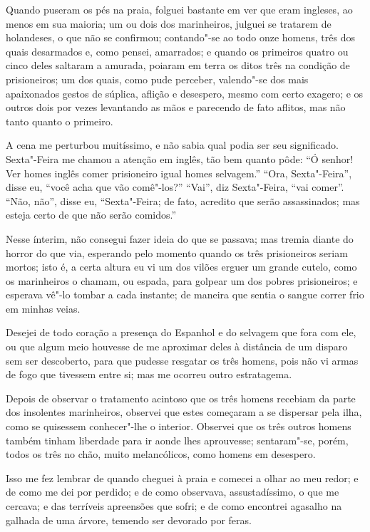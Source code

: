 Quando puseram os pés na praia, folguei bastante em ver que eram
ingleses, ao menos em sua maioria; um ou dois dos marinheiros, julguei
se tratarem de holandeses, o que não se confirmou; contando"-se ao todo
onze homens, três dos quais desarmados e, como pensei, amarrados; e
quando os primeiros quatro ou cinco deles saltaram a amurada, poiaram em
terra os ditos três na condição de prisioneiros; um dos quais, como pude
perceber, valendo"-se dos mais apaixonados gestos de súplica, aflição e
desespero, mesmo com certo exagero; e os outros dois por vezes
levantando as mãos e parecendo de fato aflitos, mas não tanto quanto o
primeiro.

A cena me perturbou muitíssimo, e não sabia qual podia ser seu
significado. Sexta"-Feira me chamou a atenção em inglês, tão bem quanto
pôde: ``Ó senhor! Ver homes inglês comer prisioneiro igual homes
selvagem.'' ``Ora, Sexta"-Feira'', disse eu, ``você acha que vão
comê"-los?'' ``Vai'', diz Sexta"-Feira, ``vai comer''. ``Não, não'', disse
eu, ``Sexta"-Feira; de fato, acredito que serão assassinados; mas esteja
certo de que não serão comidos.''

Nesse ínterim, não consegui fazer ideia do que se passava; mas tremia
diante do horror do que via, esperando pelo momento quando os três
prisioneiros seriam mortos; isto é, a certa altura eu vi um dos vilões
erguer um grande cutelo, como os marinheiros o chamam, ou espada, para
golpear um dos pobres prisioneiros; e esperava vê"-lo tombar a cada
instante; de maneira que sentia o sangue correr frio em minhas veias.

Desejei de todo coração a presença do Espanhol e do selvagem que fora
com ele, ou que algum meio houvesse de me aproximar deles à distância de
um disparo sem ser descoberto, para que pudesse resgatar os três homens,
pois não vi armas de fogo que tivessem entre si; mas me ocorreu outro
estratagema.

Depois de observar o tratamento acintoso que os três homens recebiam da
parte dos insolentes marinheiros, observei que estes começaram a se
dispersar pela ilha, como se quisessem conhecer"-lhe o interior. Observei
que os três outros homens também tinham liberdade para ir aonde lhes
aprouvesse; sentaram"-se, porém, todos os três no chão, muito
melancólicos, como homens em desespero.

Isso me fez lembrar de quando cheguei à praia e comecei a olhar ao meu
redor; e de como me dei por perdido; e de como observava,
assustadíssimo, o que me cercava; e das terríveis apreensões que sofri;
e de como encontrei agasalho na galhada de uma árvore, temendo ser
devorado por feras.

